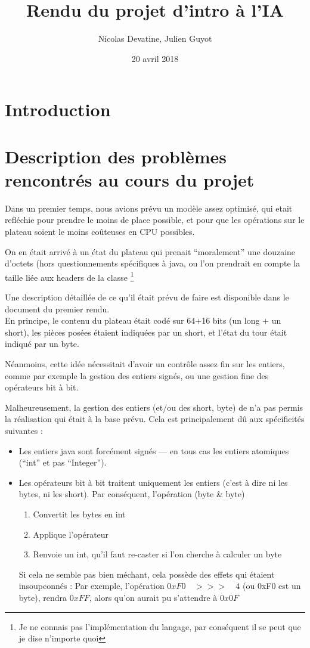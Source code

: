 \documentclass{article}
\author{Nicolas Devatine, Julien Guyot}
\title{Rendu du projet d'intro à l'IA}
\date{20 avril 2018}
\begin{document}
\maketitle
\section{Introduction}

\section{Description des problèmes rencontrés au cours du projet}
Dans un premier temps, nous avions prévu un modèle assez
optimisé, qui etait refléchie pour prendre le moins de place possible,
et pour que les opérations sur le plateau soient le moins coûteuses en
CPU possibles. 



On en était arrivé à un état du plateau qui prenait ``moralement'' une
douzaine d'octets (hors questionnements spécifiques à
java, ou l'on prendrait en compte la taille liée aux headers de la
classe \footnote{Je ne connais pas l'implémentation du
  langage, par conséquent il se peut que je dise n'importe quoi}


Une description détaillée de ce qu'il était prévu de faire est
disponible dans le document du premier rendu.\\
En principe, le contenu du plateau était codé sur 64+16 bits (un long
+ un short), les pièces posées étaient indiquées par un short, et
l'état du tour était indiqué par un byte. 



Néanmoins, cette idée nécessitait d'avoir un contrôle assez fin sur les
entiers, comme par exemple la gestion des entiers signés, ou une
gestion fine des opérateurs bit à bit.


Malheureusement, la gestion des entiers (et/ou des short, byte) de n'a
pas permis la réalisation qui était à la base prévu. Cela est
principalement dû aux
spécificités suivantes :
\begin{itemize}
\item Les entiers java sont forcément signés --- en tous cas les
  entiers atomiques (``int'' et pas ``Integer''). 
\item Les opérateurs bit à bit traitent uniquement les entiers
  (c'est à dire ni les bytes, ni les short). Par conséquent,
  l'opération (byte \& byte) \begin{enumerate}
    \item Convertit les bytes en int 
    \item Applique l'opérateur 
    \item Renvoie un int, qu'il faut re-caster si l'on cherche à calculer un byte
  \end{enumerate}
  Si cela ne semble pas bien méchant, cela possède des
  effets qui étaient insoupconnés : Par exemple, l'opération
  \(0xF0\quad>>>\quad4 \) (ou 0xF0 est un byte), rendra \(0xFF\),
  alors qu'on aurait pu s'attendre à \( 0x0F \)
\end{itemize}
\end{document}
